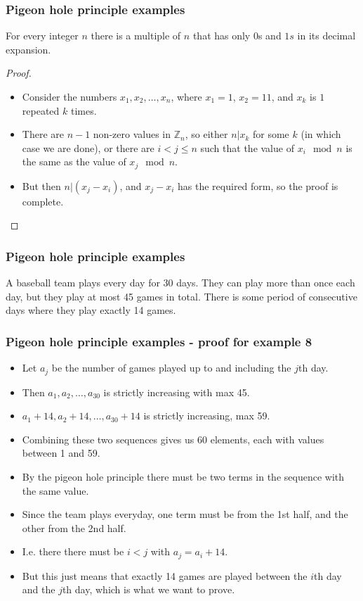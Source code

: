 \documentclass[handout]{beamer}
\newcommand{\bZ}{\mathbb{Z}}
\begin{document}
\begin{frame}
\frametitle{Pigeon hole principle examples}
\begin{example}
For every integer $n$ there is a multiple of $n$ that has only $0$s and $1s$ in its decimal expansion.
\end{example}
\begin{proof}
\begin{itemize}
\item Consider the numbers $x_1,x_2,\ldots,x_{n}$, where $x_1=1$, $x_2=11$, and $x_k$ is $1$ repeated $k$ times. \vspace{0.2cm}
\item There are $n-1$ non-zero values in $\bZ_n$, so either $n|x_k$ for some $k$ (in which case we are done), or there are $i<j\leq n$ such that the value of $x_i \mod n$ is the same as the value of $x_j \mod n$. \vspace{0.2cm}
\item But then $n|(x_j-x_i)$, and $x_j-x_i$ has the required form, so the proof is complete.
\end{itemize}
\end{proof}
\end{frame}

\begin{frame}
\frametitle{Pigeon hole principle examples}
\begin{example}
A baseball team plays every day for 30 days. They can play more than once each day, but they play at most 45 games in total. There is some period of consecutive days where they play exactly 14 games.
\end{example}
\end{frame}

\begin{frame}
\frametitle{Pigeon hole principle examples - proof for example 8}
\begin{itemize}
\item Let $a_j$ be the number of games played up to and including the $j$th day. 
\item Then $a_1,a_2,\ldots,a_{30}$ is strictly increasing with max 45. 
\item $a_1 + 14,a_2+14,\ldots, a_{30}+14$ is strictly increasing, max 59. 
\item Combining these two sequences gives us 60 elements, each with values between 1 and 59. 
\item By the pigeon hole principle there must be two terms in the sequence with the same value.
\item Since the team plays everyday, one term must be from the 1st half, and the other from the 2nd half. 
\item I.e. there there must be $i < j$ with $a_j=a_i+14$. 
\item But this just means that exactly 14 games are played between the $i$th day and the $j$th day, which is what we want to prove. 
\end{itemize}
\end{frame}
\end{document}
